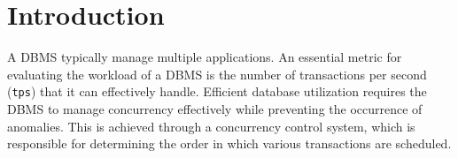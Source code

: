 \section{Introduction}

A DBMS typically manage multiple applications.
An essential metric for evaluating the workload of a DBMS is the number of transactions per second (\texttt{tps}) that it can effectively handle. 
Efficient database utilization requires the DBMS to manage concurrency effectively while preventing the occurrence of anomalies. 
This is achieved through a concurrency control system, which is responsible for determining the order in which various transactions are scheduled.